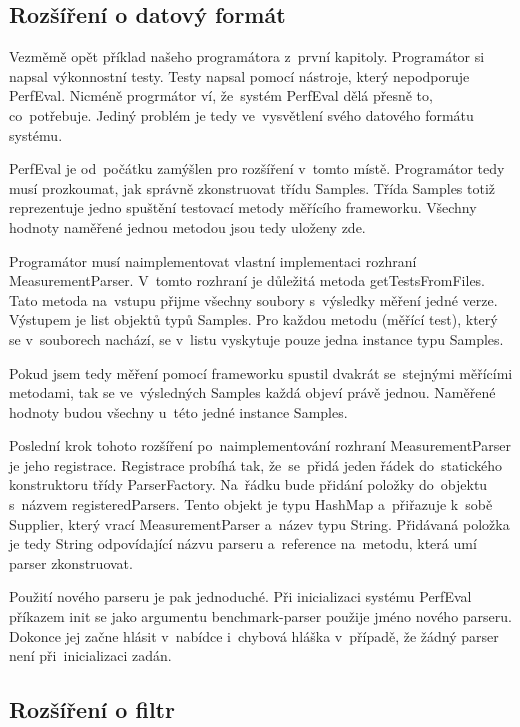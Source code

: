 \subsection{Rozšíření o datový formát}

Vezměmě opět příklad našeho programátora z~první kapitoly. Programátor si napsal výkonnostní testy.
Testy napsal pomocí nástroje, který nepodporuje PerfEval. Nicméně progrmátor ví, že~systém PerfEval
dělá přesně to, co~potřebuje. Jediný problém je tedy ve~vysvětlení svého datového formátu systému.

PerfEval je od~počátku zamýšlen pro rozšíření v~tomto místě. Programátor tedy musí prozkoumat, jak správně zkonstruovat
třídu Samples. Třída Samples totiž reprezentuje jedno spuštění testovací metody měřícího frameworku. Všechny hodnoty
naměřené jednou metodou jsou tedy uloženy zde.

Programátor musí naimplementovat vlastní implementaci rozhraní MeasurementParser. V~tomto rozhraní je důležitá metoda
getTestsFromFiles. Tato metoda na~vstupu přijme všechny soubory s~výsledky měření jedné verze. Výstupem je list objektů
typů Samples. Pro každou metodu (měřící test), který se v~souborech nachází, se v~listu vyskytuje pouze jedna instance
typu Samples.

Pokud jsem tedy měření pomocí frameworku spustil dvakrát se~stejnými měřícími metodami, tak se ve~výsledných Samples
každá objeví právě jednou. Naměřené hodnoty budou všechny u~této jedné instance Samples.

Poslední krok tohoto rozšíření po~naimplementování rozhraní MeasurementParser je jeho registrace. Registrace probíhá tak,
že~se~přidá jeden řádek do~statického konstruktoru třídy ParserFactory. Na~řádku bude přidání položky do~objektu
s~názvem registeredParsers. Tento objekt je typu HashMap a~přiřazuje k~sobě Supplier, který vrací MeasurementParser
a~název typu String. Přidávaná položka je tedy String odpovídající názvu parseru a~reference na~metodu,
která umí parser zkonstruovat.

Použití nového parseru je pak jednoduché. Při inicializaci systému PerfEval příkazem init se jako argumentu
benchmark-parser použije jméno nového parseru. Dokonce jej začne hlásit v~nabídce i~chybová hláška v~případě, že žádný parser
není při~inicializaci zadán.

\subsection{Rozšíření o filtr}

